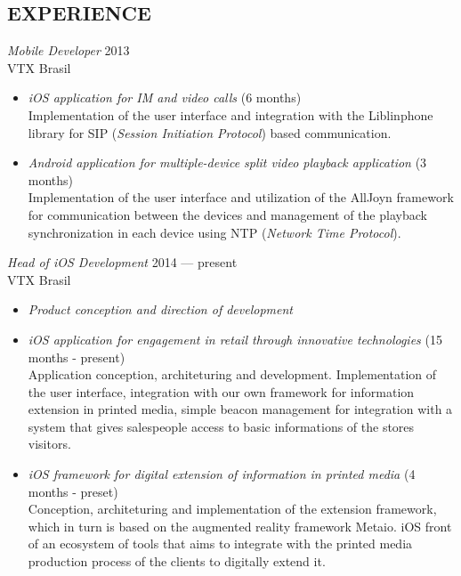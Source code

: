 \documentclass[]{res} %
\newcommand{\sbt}{\,\begin{picture}(-1,1)(-2,-3)\circle*{2}\end{picture}\ }
\def \divspace{6pt}
\def \myitemback{0.55cm}
\def \myitemsep{0pt}
\def \mypositionface{\sl}
\def \myorgface{\sc}
\newif\ifport
\begin{document}
\begin{resume}
    \section{EXPERIENCE \hspace{\divspace} }

    {\mypositionface Mobile Developer} \hfill 2013 \\
    {\myorgface VTX Brasil}

    \begin{itemize}[itemsep=\myitemsep,leftmargin=\myitemback]
    \item[\sbt] {\it iOS application for IM and video calls} \hfill (6 months)\\
    Implementation of the user interface and integration with the Liblinphone library for SIP ({\it Session Initiation Protocol}) based communication.
    \item[\sbt] {\it Android application for multiple-device split video playback application} \hfill (3 months)\\
    Implementation of the user interface and utilization of the AllJoyn framework for communication between the devices and management of the playback synchronization in each device using NTP ({\it Network Time Protocol}).
    \end{itemize}

    {\mypositionface Head of iOS Development} \hfill 2014 — present\\
    {\myorgface VTX Brasil}

    \begin{itemize}[itemsep=\myitemsep,leftmargin=\myitemback]
    \item[\sbt] {\it Product conception and direction of development}
    \item[\sbt] {\it iOS application for engagement in retail through innovative technologies} \hfill (15 months - present)\\
    Application conception, architeturing and development. Implementation of the user interface, integration with our own framework for information extension in printed media, simple beacon management for integration with a system that gives salespeople access to basic informations of the stores visitors.
    \item[\sbt] {\it iOS framework for digital extension of information in printed media} \hfill (4 months - preset)\\
    Conception, architeturing and implementation of the extension framework, which in turn is based on the augmented reality framework Metaio. iOS front of an ecosystem of tools that aims to integrate with the printed media production process of the clients to digitally extend it.\\
    \end{itemize}
\fi
\ifport

\end{resume}
\end{document}
